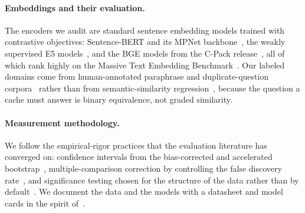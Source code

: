 \paragraph{Embeddings and their evaluation.}
The encoders we audit are standard sentence embedding models trained with contrastive
objectives: Sentence-BERT and its \mbox{MPNet} backbone~\cite{reimers2019sentencebert,song2020mpnet},
the weakly supervised \mbox{E5} models~\cite{wang2022e5}, and the \mbox{BGE} models from the
\mbox{C-Pack} release~\cite{xiao2023cpack}, all of which rank highly on the Massive Text
Embedding Benchmark~\cite{muennighoff2023mteb}. Our labeled domains come from human-annotated
paraphrase and duplicate-question corpora~\cite{wang2019glue,dolan2005mrpc,zhang2019paws}
rather than from semantic-similarity regression~\cite{cer2017sts}, because the question a
cache must answer is binary equivalence, not graded similarity.

\paragraph{Measurement methodology.}
We follow the empirical-rigor practices that the evaluation literature has converged on:
confidence intervals from the bias-corrected and accelerated
bootstrap~\cite{efron1987bootstrap,efron1993bootstrap}, multiple-comparison correction by
controlling the false discovery rate~\cite{benjamini1995fdr}, and significance testing
chosen for the structure of the data rather than by default~\cite{dror2018hitchhiker}. We
document the data and the models with a datasheet and model cards in the
spirit of~\cite{gebru2021datasheets,mitchell2019modelcards}.
